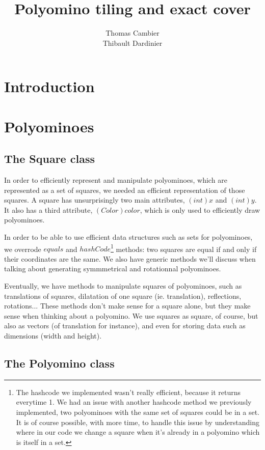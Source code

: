 \documentclass[12pt]{article}
\title{Polyomino tiling and exact cover}
\author{Thomas Cambier\\Thibault Dardinier}
\begin{document}
\maketitle
\tableofcontents
\newpage

\section*{Introduction}

\section{Polyominoes}

\subsection{The Square class}

In order to efficiently represent and manipulate polyominoes, which are represented as a set of squares, we needed an efficient representation of those squares.
A square has unsurprisingly two main attributes, $(int) x$ and $(int) y$.
It also has a third attribute, $(Color) color$, which is only used to efficiently draw polyominoes.

In order to be able to use efficient data structures such as sets for polyominoes, we overrode $equals$ and $hashCode$\footnote{The hashcode we implemented wasn’t really efficient, because it returns everytime 1.
We had an issue with another hashcode method we previously implemented, two polyominoes with the same set of squares could be in a set.
It is of course possible, with more time, to handle this issue by understanding where in our code we change a square when it’s already in a polyomino which is itself in a set.}
 methods: two squares are equal if and only if their coordinates are the same.
We also have generic methods we’ll discuss when talking about generating symmmetrical
and rotationnal polyominoes.

Eventually, we have methods to manipulate squares of polyominoes, such as translations of squares, dilatation of one square (ie. translation), reflections, rotations...
These methods don’t make sense for a square alone, but they make sense when thinking about a polyomino.
We use squares as square, of course, but also as vectors (of translation for instance), and even for storing data such as dimensions (width and height).


\subsection{The Polyomino class}
\end{document}
